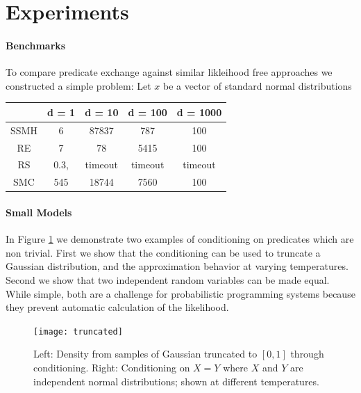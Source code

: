 
\section{Experiments}\label{experiments}

\paragraph{Benchmarks}
To compare predicate exchange against similar likleihood free approaches we constructed a simple problem:
Let $x$ be a vector of standard normal distributions





\begin{center}
	\begin{tabular}{||c| c c c c||} 
	\hline
	 & d = 1 & d = 10 & d = 100 & d = 1000 \\ [0.5ex] 
	\hline\hline
	SSMH & 6 & 87837 & 787 & 100\\ 
	\hline
	RE & 7 & 78 & 5415 & 100\\
	\hline
	RS & 0.3, & timeout & timeout & timeout \\
	\hline
	SMC & 545 & 18744 & 7560 & 100 \\
	\hline
 \end{tabular}
 \end{center}
 
 

\paragraph{Small Models}
In Figure \ref{fig:density} we demonstrate two examples of conditioning on predicates which are non trivial.
First we show that the conditioning can be used to truncate a Gaussian distribution, and the approximation behavior at varying temperatures.  Second we show that two independent random variables can be made equal.  While simple, both are a challenge for probabilistic programming systems because they prevent automatic calculation of the likelihood.

\begin{figure}[!htb]
\centering
\texttt{[image: truncated]}

	
	
	\caption{Left: Density from samples of Gaussian truncated to $[0, 1]$ through conditioning. Right: Conditioning on $X = Y$ where $X$ and $Y$ are independent normal distributions; shown at different temperatures.}
	\label{fig:density}
\end{figure}



